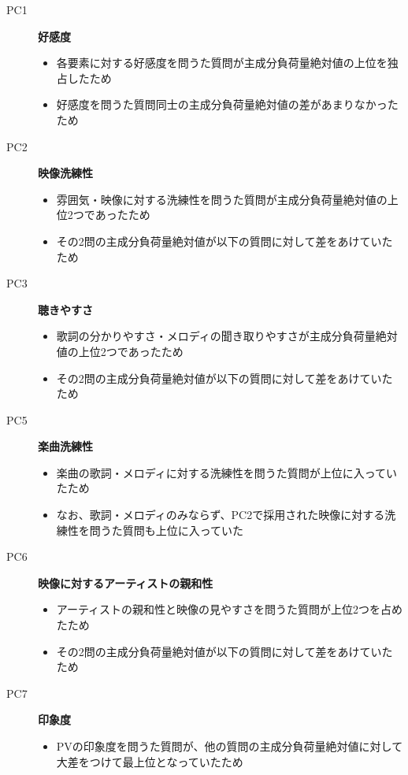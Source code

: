 \documentclass[11pt,a4paper, uplatex]{jsarticle}
\begin{document}
\begin{description}
  \item[PC1] {\bf 好感度}
  \begin{itemize}
    \item 各要素に対する好感度を問うた質問が主成分負荷量絶対値の上位を独占したため
    \item 好感度を問うた質問同士の主成分負荷量絶対値の差があまりなかったため
  \end{itemize}

  \item[PC2] {\bf 映像洗練性}
  \begin{itemize}
    \item 雰囲気・映像に対する洗練性を問うた質問が主成分負荷量絶対値の上位2つであったため
    \item その2問の主成分負荷量絶対値が以下の質問に対して差をあけていたため
  \end{itemize}

  \item[PC3] {\bf 聴きやすさ}
  \begin{itemize}
    \item 歌詞の分かりやすさ・メロディの聞き取りやすさが主成分負荷量絶対値の上位2つであったため
    \item その2問の主成分負荷量絶対値が以下の質問に対して差をあけていたため
  \end{itemize}

  \item[PC5] {\bf 楽曲洗練性}
  \begin{itemize}
    \item 楽曲の歌詞・メロディに対する洗練性を問うた質問が上位に入っていたため
    \item なお、歌詞・メロディのみならず、PC2で採用された映像に対する洗練性を問うた質問も上位に入っていた
  \end{itemize}

  \item[PC6] {\bf 映像に対するアーティストの親和性}
  \begin{itemize}
    \item アーティストの親和性と映像の見やすさを問うた質問が上位2つを占めたため
    \item その2問の主成分負荷量絶対値が以下の質問に対して差をあけていたため
  \end{itemize}

  \item[PC7] {\bf 印象度}
  \begin{itemize}
    \item PVの印象度を問うた質問が、他の質問の主成分負荷量絶対値に対して大差をつけて最上位となっていたため
  \end{itemize}
\end{description}
\end{document}
